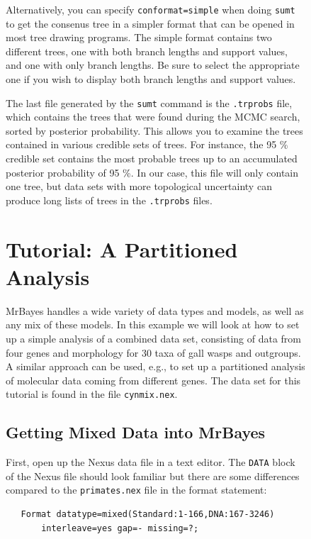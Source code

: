 \documentclass[12pt]{book}
\newcommand{\ttt}[1]{\texttt{#1}}
\begin{document}
\begin{figure}[h]
Alternatively, you can specify \ttt{conformat=simple} when doing \ttt{sumt} to get the consenus
tree in a simpler format that can be opened in most tree drawing programs. The simple format
contains two different trees, one with both branch lengths and support values, and one with only
branch lengths. Be sure to select the appropriate one if you wish to display both branch lengths
and support values.

The last file generated by the \ttt{sumt} command is the \ttt{.trprobs} file, which contains the
trees that were found during the MCMC search, sorted by posterior probability. This allows you to
examine the trees contained in various credible sets of trees. For instance, the 95 \% credible set
contains the most probable trees up to an accumulated posterior probability of 95 \%. In our case,
this file will only contain one tree, but data sets with more topological uncertainty can produce
long lists of trees in the \ttt{.trprobs} files.

\chapter{Tutorial: A Partitioned Analysis}
\label{tutorialPartitioned}
MrBayes handles a wide variety of data types and models, as well as any mix of these models. In
this example we will look at how to set up a simple analysis of a combined data set, consisting of
data from four genes and morphology for 30 taxa of gall wasps and outgroups. A similar approach can
be used, e.g., to set up a partitioned analysis of molecular data coming from different genes. The
data set for this tutorial is found in the file \ttt{cynmix.nex}.

\section{Getting Mixed Data into MrBayes}

First, open up the Nexus data file in a text editor. The \ttt{DATA} block of the Nexus file should
look familiar but there are some differences compared to the \ttt{primates.nex} file in the format
statement:

\begin{singlespacing}
\footnotesize
\begin{verbatim}
   Format datatype=mixed(Standard:1-166,DNA:167-3246)
       interleave=yes gap=- missing=?;
\end{verbatim}
\normalsize
\end{singlespacing}


\end{figure}
\end{document}
